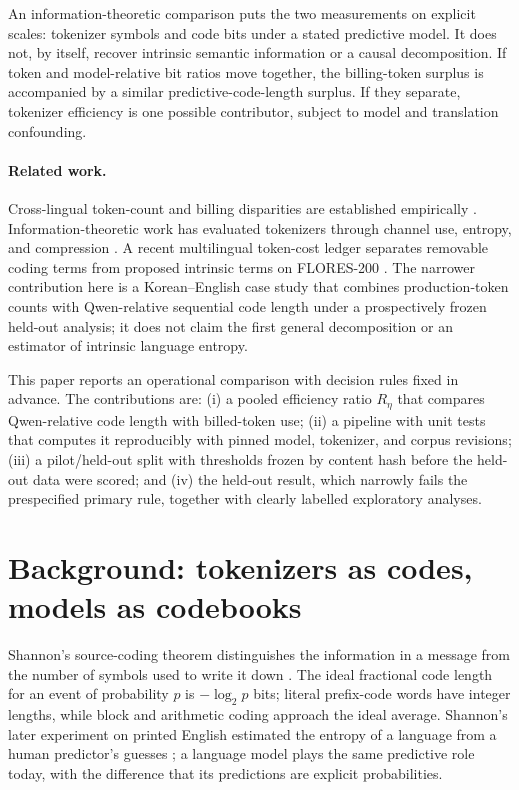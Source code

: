 \documentclass[11pt,a4paper]{article}
\newcommand{\Reta}{R_{\eta}}
\begin{document}
An information-theoretic comparison puts the two measurements on explicit
scales: tokenizer symbols and code bits under a stated predictive model. It
does not, by itself, recover intrinsic semantic information or a causal
decomposition. If token and model-relative bit ratios move together, the
billing-token surplus is accompanied by a similar predictive-code-length
surplus. If they separate, tokenizer efficiency is one possible contributor,
subject to model and translation confounding.

\paragraph{Related work.} Cross-lingual token-count and billing disparities
are established empirically \citep{ahia2023,petrov2023}. Information-theoretic
work has evaluated tokenizers through channel use, entropy, and compression
\citep{zouhar2023,erdogan2026}. A recent multilingual token-cost ledger
separates removable coding terms from proposed intrinsic terms on FLORES-200
\citep{mandarapu2026}. The narrower contribution here is a Korean--English
case study that combines production-token counts with Qwen-relative
sequential code length under a prospectively frozen held-out analysis; it
does not claim the first general decomposition or an estimator of intrinsic
language entropy.

This paper reports an operational comparison with decision rules fixed in
advance. The contributions are: (i) a pooled efficiency ratio $\Reta$ that
compares Qwen-relative code length with billed-token use; (ii) a
pipeline with unit tests that computes it reproducibly with pinned model,
tokenizer, and corpus revisions; (iii) a pilot/held-out split with
thresholds frozen by content hash before the held-out data were scored; and
(iv) the held-out result, which narrowly fails the prespecified primary rule,
together with clearly labelled exploratory analyses.

\section{Background: tokenizers as codes, models as codebooks}
\label{sec:background}

Shannon's source-coding theorem distinguishes the information in a message
from the number of symbols used to write it down \citep{shannon1948}. The
ideal fractional code length for an event of probability $p$ is
$-\log_2 p$ bits; literal prefix-code words have integer lengths, while block
and arithmetic coding approach the ideal average.
Shannon's later experiment on printed English estimated the entropy of a
language from a human predictor's guesses \citep{shannon1951}; a language
model plays the same predictive role today, with the difference that its
predictions are explicit probabilities.
\end{document}
